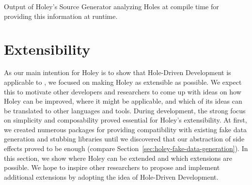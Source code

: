 \begin{program}[ht]
\caption{Output of Holey's Source Generator analyzing Holes at compile time for providing this information at runtime.}
\label{prg:holey-source-generators}
\end{program}

\section{Extensibility}
\label{sec:holey-extensibility}
As our main intention for Holey is to show that Hole-Driven Development is applicable to \CS, we focused on making Holey as extensible as possible.
We expect this to motivate other developers and researchers to come up with ideas on how Holey can be improved, where it might be applicable, and which of its ideas can be translated to other languages and tools.
During development, the strong focus on simplicity and composability proved essential for Holey's extensibility.
At first, we created numerous packages for providing compatibility with existing fake data generation and stubbing libraries until we discovered that our abstraction of side effects proved to be enough (compare Section~\ref{sec:holey-fake-data-generation}).
In this section, we show where Holey can be extended and which extensions are possible.
We hope to inspire other researchers to propose and implement additional extensions by adopting the idea of Hole-Driven Development.

